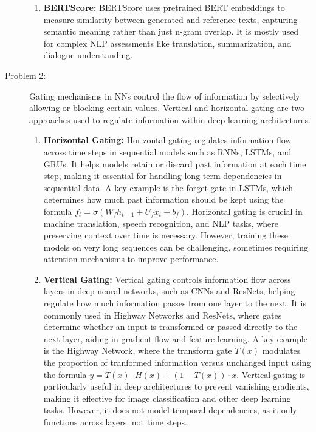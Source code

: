 \documentclass[10pt]{article}
\begin{document}
\begin{description}
\begin{enumerate}
    \item \textbf{BERTScore:} BERTScore uses pretrained BERT embeddings to measure similarity between generated and reference texts, capturing semantic 
    meaning rather than just n-gram overlap. It is mostly used for complex NLP assessments like translation, summarization, and dialogue understanding.

\end{enumerate}

\pagebreak

\item[Problem 2:]  \hfill %

Gating mechanisms in NNs control the flow of information by selectively allowing or blocking certain values. 
Vertical and horizontal gating are two approaches used to regulate information within deep learning architectures.

\begin{enumerate}
    \item \textbf{Horizontal Gating:} Horizontal gating regulates information flow across time steps in sequential models such as RNNs,
    LSTMs, and GRUs. It helps models retain or discard past information at each time step, making it essential for handling long-term dependencies in sequential data.
    A key example is the forget gate in LSTMs, which determines how much past information should be kept using the formula $f_t = \sigma(W_f h_{t-1} + U_f x_t + b_f)$.
    Horizontal gating is crucial in machine translation, speech recognition, and NLP tasks, where preserving context over time is necessary. 
    However, training these models on very long sequences can be challenging, sometimes requiring attention mechanisms to improve performance.

    \item \textbf{Vertical Gating:} Vertical gating controls information flow across layers in deep neural networks, such as CNNs and ResNets, 
    helping regulate how much information passes from one layer to the next. 
    It is commonly used in Highway Networks and ResNets, where gates determine whether an input is transformed or passed directly to the next layer,
    aiding in gradient flow and feature learning. A key example is the Highway Network, where the transform gate $T(x)$ modulates the proportion of tranformed information
    versus unchanged input using the formula $y = T(x) \cdot H(x) + (1 - T(x)) \cdot x$. Vertical gating is particularly useful in deep architectures to prevent vanishing 
    gradients, making it effective for image classification and other deep learning tasks. However, it does not model temporal dependencies, as it only functions across 
    layers, not time steps.
    

\end{enumerate}
\end{description}
\end{document}
